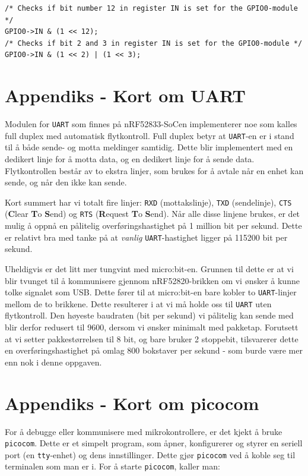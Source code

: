 \begin{lstlisting}
/* Checks if bit number 12 in register IN is set for the GPIO0-module */
GPIO0->IN & (1 << 12);
/* Checks if bit 2 and 3 in register IN is set for the GPIO0-module */
GPIO0->IN & (1 << 2) | (1 << 3);
\end{lstlisting}



\section{Appendiks - Kort om UART}\label{app:uart}


Modulen for \verb|UART| som finnes på nRF52833-SoCen implementerer noe som kalles full duplex med automatisk flytkontroll. Full duplex betyr at \verb|UART|-en er i stand til å både sende- og motta meldinger samtidig. Dette blir implementert med en dedikert linje for å motta data, og en dedikert linje for å sende data. Flytkontrollen består av to ekstra linjer, som brukes for å avtale når en enhet kan sende, og når den ikke kan sende.

Kort summert har vi totalt fire linjer: \verb|RXD| (mottakslinje), \verb|TXD| (sendelinje), \verb|CTS| (\textbf{C}lear \textbf{T}o \textbf{S}end) og \verb|RTS| (\textbf{R}equest \textbf{T}o \textbf{S}end). Når alle disse linjene brukes, er det mulig å oppnå en pålitelig overføringshastighet på 1 million bit per sekund. Dette er relativt bra med tanke på at \textit{vanlig} \verb|UART|-hastighet ligger på 115200 bit per sekund.

Uheldigvis er det litt mer tungvint med micro:bit-en. Grunnen til dette er at vi blir tvunget til å kommunisere gjennom nRF52820-brikken om vi ønsker å kunne tolke signalet som USB. Dette fører til at micro:bit-en bare kobler to \verb|UART|-linjer mellom de to brikkene. Dette resulterer i at vi må holde oss til \verb|UART| uten flytkontroll. Den høyeste baudraten (bit per sekund) vi pålitelig kan sende med blir derfor redusert til 9600, dersom vi ønsker minimalt med pakketap. Forutsett at vi setter pakkestørrelsen til 8 bit, og bare bruker 2 stoppebit, tilsvarerer dette en overføringshastighet på omlag 800 bokstaver per sekund - som burde være mer enn nok i denne oppgaven. 


\section{Appendiks - Kort om picocom}\label{app:picocom}

For å debugge eller kommunisere med mikrokontrollere, er det kjekt å bruke \verb|picocom|. Dette er et simpelt program, som åpner, konfigurerer og styrer en seriell port (en \verb|tty|-enhet) og dens innstillinger. Dette gjør \verb|picocom| ved å koble seg til terminalen som man er i. For å starte \verb|picocom|, kaller man:

